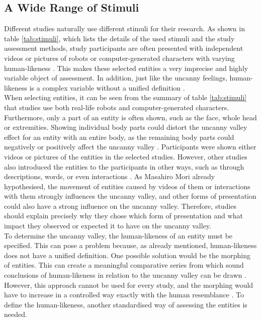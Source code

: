 \subsection{A Wide Range of Stimuli}
Different studies naturally use different stimuli for their research. As shown in table \ref{tab:stimuli}, which lists the details of the used stimuli and the study assessment methods, study participants are often presented with independent videos or pictures of robots or computer-generated characters with varying human-likeness \cite{quant_review}. This makes these selected entities a very imprecise and highly variable object of assessment. In addition, just like the uncanny feelings, human-likeness is a complex variable without a unified definition \cite{quant_review}.\\
When selecting entities, it can be seen from the summary of table \ref{tab:stimuli} that studies use both real-life robots and computer-generated characters. Furthermore, only a part of an entity is often shown, such as the face, whole head or extremities. Showing individual body parts could distort the uncanny valley effect for an entity with an entire body, as the remaining body parts could negatively or positively affect the uncanny valley \cite{quant_review}. Participants were shown either videos or pictures of the entities in the selected studies. However, other studies also introduced the entities to the participants in other ways, such as through descriptions, words, or even interactions \cite{quant_review}. As Masahiro Mori \cite{original_masahiro} already hypothesised, the movement of entities caused by videos of them or interactions with them strongly influences the uncanny valley, and other forms of presentation could also have a strong influence on the uncanny valley. Therefore, studies should explain precisely why they chose which form of presentation and what impact they observed or expected it to have on the uncanny valley.\\
To determine the uncanny valley, the human-likeness of an entity must be specified. This can pose a problem because, as already mentioned, human-likeness does not have a unified definition.
One possible solution would be the morphing of entities. This can create a meaningful comparative series from which sound conclusions of human-likeness in relation to the uncanny valley can be drawn \cite{quant_review}. However, this approach cannot be used for every study, and the morphing would have to increase in a controlled way exactly with the human resemblance \cite{quant_review}.
To define the human-likeness, another standardised way of assessing the entities is needed.

